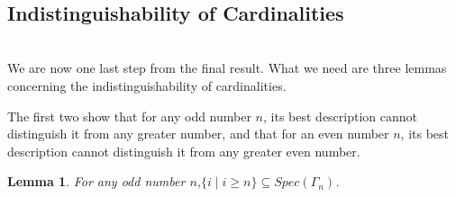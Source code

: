 \documentclass[12pt, reqno]{amsart}
\newtheorem{lemma}[theorem]{Lemma}
\theoremstyle{definition}
\theoremstyle{remark}
\numberwithin{equation}{section}
\begin{document}
\hfill \\ 
\subsection{Indistinguishability of Cardinalities} \hfill \\ 


We are now one last step from the final result. What we need are three lemmas concerning the indistinguishability of cardinalities. 

The first two show that for any odd number $n$, its best description cannot distinguish it from any greater number, and that for an even number $n$, its best description cannot distinguish it from any greater even number.

\begin{lemma}\label{o_indiscernible}
	For any odd number $n$,$\{i \mid i \geq n\}\subseteq Spec(\Gamma_n)$.  
\end{lemma}
\end{document}
